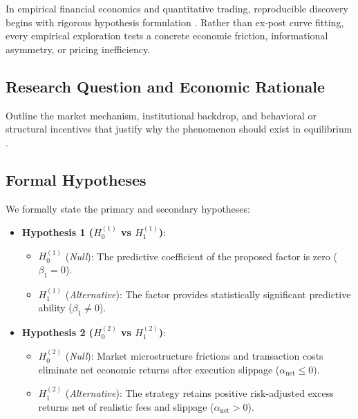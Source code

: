 \documentclass{article}
\begin{document}
In empirical financial economics and quantitative trading, reproducible discovery begins with rigorous hypothesis formulation \citep{fama1970efficient}. Rather than ex-post curve fitting, every empirical exploration tests a concrete economic friction, informational asymmetry, or pricing inefficiency.

\subsection{Research Question and Economic Rationale}
Outline the market mechanism, institutional backdrop, and behavioral or structural incentives that justify why the phenomenon should exist in equilibrium \citep{stoll1990dynamics, shleifer1997limits}.

\subsection{Formal Hypotheses}
We formally state the primary and secondary hypotheses:
\begin{itemize}
    \item \textbf{Hypothesis 1 ($H_0^{(1)}$ vs $H_1^{(1)}$)}:
    \begin{itemize}
        \item $H_0^{(1)}$ (\textit{Null}): The predictive coefficient of the proposed factor is zero ($\beta_1 = 0$).
        \item $H_1^{(1)}$ (\textit{Alternative}): The factor provides statistically significant predictive ability ($\beta_1 \ne 0$).
    \end{itemize}
    \item \textbf{Hypothesis 2 ($H_0^{(2)}$ vs $H_1^{(2)}$)}:
    \begin{itemize}
        \item $H_0^{(2)}$ (\textit{Null}): Market microstructure frictions and transaction costs eliminate net economic returns after execution slippage ($\alpha_{\text{net}} \le 0$).
        \item $H_1^{(2)}$ (\textit{Alternative}): The strategy retains positive risk-adjusted excess returns net of realistic fees and slippage ($\alpha_{\text{net}} > 0$).
    \end{itemize}
\end{itemize}

\end{document}
